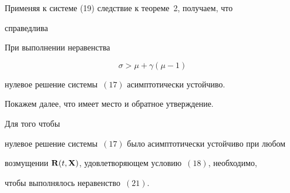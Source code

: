 Применяя к системе (19) следствие к теореме~2, получаем, что


справедлива





\begin{thm}


При выполнении неравенства


\begin{equation}


\sigma> \mu+\gamma (\mu-1)


\end{equation}


нулевое решение системы~$(17)$ асимптотически устойчиво.


\end{thm}





Покажем далее, что имеет место и обратное утверждение.





\begin{thm}


Для того чтобы


нулевое решение системы~$(17)$ было асимптотически устойчиво при любом


возмущении $\bold R(t,\bold X)$, удовлетворяющем условию~$(18)$, необходимо,


чтобы выполнялось неравенство~$(21)$.


\end{thm}





